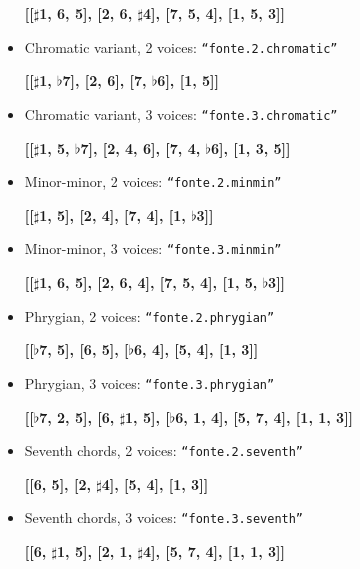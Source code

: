 \documentclass[11pt, openany]{article}
\begin{document}
\begin{itemize}
\begin{center}
	\textbf{[[$\sharp$1, 6, 5], [2, 6, $\sharp$4], [7, 5, 4], [1, 5, 3]]}
	\end{center}
\item Chromatic variant, 2 voices: \texttt{“fonte.2.chromatic”}
	\begin{center}
	\textbf{[[$\sharp$1, $\flat$7], [2, 6], [7, $\flat$6], [1, 5]]}
	\end{center}
\item Chromatic variant, 3 voices: \texttt{“fonte.3.chromatic”}
	\begin{center}
	\textbf{[[$\sharp$1, 5, $\flat$7], [2, 4, 6], [7, 4, $\flat$6], [1, 3, 5]]}
	\end{center}
\item Minor-minor, 2 voices: \texttt{“fonte.2.minmin”}
	\begin{center}
	\textbf{[[$\sharp$1, 5], [2, 4], [7, 4], [1, $\flat$3]]}
	\end{center}
\item Minor-minor, 3 voices: \texttt{“fonte.3.minmin”}
	\begin{center}
	\textbf{[[$\sharp$1, 6, 5], [2, 6, 4], [7, 5, 4], [1, 5, $\flat$3]]}
	\end{center}
\item Phrygian, 2 voices: \texttt{“fonte.2.phrygian”}
	\begin{center}
	\textbf{[[$\flat$7, 5], [6, 5], [$\flat$6, 4], [5, 4], [1, 3]]}
	\end{center}
\item Phrygian, 3 voices: \texttt{“fonte.3.phrygian”}
	\begin{center}
	\textbf{[[$\flat$7, 2, 5], [6, $\sharp$1, 5], [$\flat$6, 1, 4], [5, 7, 4], [1, 1, 3]]}
	\end{center}
\item Seventh chords, 2 voices: \texttt{“fonte.2.seventh”}
	\begin{center}
	\textbf{[[6, 5], [2, $\sharp$4], [5, 4], [1, 3]]}
	\end{center}
\item Seventh chords, 3 voices: \texttt{“fonte.3.seventh”}
	\begin{center}
	\textbf{[[6, $\sharp$1, 5], [2, 1, $\sharp$4], [5, 7, 4], [1, 1, 3]]}
	\end{center}
\end{itemize}
\end{document}
